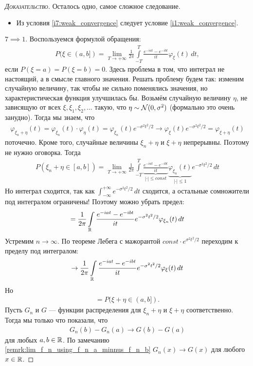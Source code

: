 \documentclass[../main.tex]{subfiles}
\begin{document}
\begin{proof}[\normalfont\textsc{Доказательство}]
 Осталось одно, самое сложное следование.

 \begin{itemize}
  \item Из условия \ref{i7:weak_convergence} следует условие \ref{i1:weak_convergence}. 
 \end{itemize}

 $ 7 \implies 1 $. Воспользуемся формулой обращения:
 \begin{align*}
  P(\xi \in (a,b]) = \lim_{T \to +\infty}  \frac{1}{2\pi} \int\limits_{-T}^{T} \frac{e^{-iat} - e^{-ibt}}{it} \varphi_\xi(t)\,dt,
 \end{align*} если $ P(\xi = a) = P(\xi = b) = 0 $. Здесь проблема в том, что интеграл не настоящий, а в смысле главного значения. Решать проблему будем так: изменим случайную величину, так чтобы не сильно поменялись значения, но характеристическая функция улучшилась бы. Возьмём случайную величину $ \eta $, не зависящую от всех $ \xi, \xi_1, \xi_2, \ldots $ такую, что $ \eta \sim \mathcal N(0, \sigma^{2}) $ (формально это очень занудно). Тогда мы знаем, что
 \begin{align*}
  \varphi_{\xi_n + \eta}(t) = \varphi_{\xi_n}(t) \cdot \varphi_\eta(t) = \varphi_{\xi_n}(t) e^{-\sigma^{2}t^{2} / 2} \to \varphi_\xi(t) e^{-\sigma^{2}t^{2} / 2} = \varphi_{\xi+\eta}(t)
 \end{align*} поточечно. Кроме того, случайные величины $ \xi_n + \eta $ и   $ \xi + \eta $ непрерывны. Поэтому не нужно оговорка. Тогда
 \begin{align*}
  P(\xi_n + \eta \in [a,b]) = \lim_{T \to +\infty}  \frac{1}{2\pi} \int\limits_{-T}^T \underbrace{\frac{e^{-iat} - e^{-ibt}}{it}}_{|\cdot| \leqslant const} \underbrace{\varphi_{\xi_n}(t)}_{|\cdot| \leqslant 1} e^{-\sigma^{2}t^{2} / 2} \,dt
 \end{align*} Но интеграл сходится, так как $\int_{-\infty}^{+\infty} e^{-\sigma^2t^2/2}\,dt$ сходится, а остальные сомножители под интегралом ограничены! Поэтому можно убрать предел:
 \begin{align*}
  = \frac{1}{2\pi} \int\limits_{\mathbb{R}} \frac{e^{-iat} - e^{-ibt}}{it} e^{-\sigma^{2}t^{2} / 2}\varphi_{\xi_n}(t)\,dt
 \end{align*} Устремим $ n \to \infty $. По теореме Лебега с мажорантой $const \cdot e^{\sigma^2t^2/2}$ переходим к пределу под интегралом:  
 \begin{align*}
  \to \frac{1}{2\pi} \int\limits_{\mathbb{R}} \frac{e^{-iat}-e^{-ibt}}{it}  e^{-\sigma^{2}t^{2} / 2}\varphi_{\xi}(t)\,dt
 \end{align*} Но
 \begin{align*}
  = P(\xi+ \eta \in (a,b]).
 \end{align*} Пусть $ G_n $ и $ G $ --- функции распределения для $ \xi_n + \eta $ и $ \xi + \eta $ соответственно. Тогда мы только что показали, что
 \begin{align*}
  G_n(b) - G_n(a) \to G(b) - G(a)
 \end{align*} для любых $ a,b\in\mathbb{R} $. По замечанию \ref{remrk:lim_f_n_using_f_n_a_minnus_f_n_b} $ G_n(x) \to G(x) $ для любого $ x \in \mathbb{R} $.


\end{proof}
\end{document}
